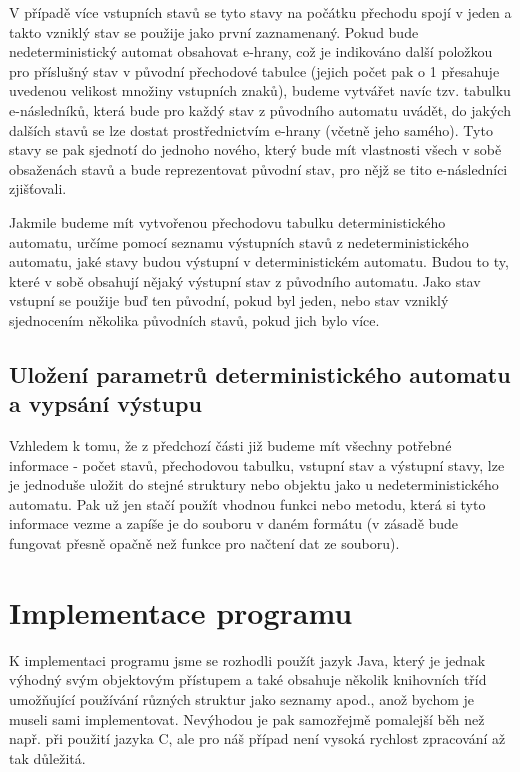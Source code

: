 \documentclass[11pt]{article}
\begin{document}
V případě více vstupních stavů se tyto stavy na počátku přechodu spojí v jeden a takto vzniklý stav se použije jako první zaznamenaný. Pokud bude nedeterministický automat obsahovat e-hrany, což je indikováno další položkou pro příslušný stav v původní přechodové tabulce (jejich počet pak o 1 přesahuje uvedenou velikost množiny vstupních znaků), budeme vytvářet navíc tzv. tabulku e-následníků, která bude pro každý stav z původního automatu uvádět, do jakých dalších stavů se lze dostat prostřednictvím e-hrany (včetně jeho samého). Tyto stavy se pak sjednotí do jednoho nového, který bude mít vlastnosti všech v sobě obsaženách stavů a bude reprezentovat původní stav, pro nějž se tito e-následníci zjišťovali.

Jakmile budeme mít vytvořenou přechodovu tabulku deterministického automatu, určíme pomocí seznamu výstupních stavů z nedeterministického automatu, jaké stavy budou výstupní v deterministickém automatu. Budou to ty, které v sobě obsahují nějaký výstupní stav z původního automatu. Jako stav vstupní se použije buď ten původní, pokud byl jeden, nebo stav vzniklý sjednocením několika původních stavů, pokud jich bylo více.

\subsection{Uložení parametrů deterministického automatu a vypsání výstupu}
Vzhledem k tomu, že z předchozí části již budeme mít všechny potřebné informace - počet stavů, přechodovou tabulku, vstupní stav a výstupní stavy, lze je jednoduše uložit do stejné struktury nebo objektu jako u nedeterministického automatu. Pak už jen stačí použít vhodnou funkci nebo metodu, která si tyto informace vezme a zapíše je do souboru v daném formátu (v zásadě bude fungovat přesně opačně než funkce pro načtení dat ze souboru). 

\newpage

\section{Implementace programu}
K implementaci programu jsme se rozhodli použít jazyk Java, který je jednak výhodný svým objektovým přístupem a také obsahuje několik knihovních tříd umožňující používání různých struktur jako seznamy apod., anož bychom je museli sami implementovat. Nevýhodou je pak samozřejmě pomalejší běh než např. při použití jazyka C, ale pro náš případ není vysoká rychlost zpracování až tak důležitá.
\end{document}
